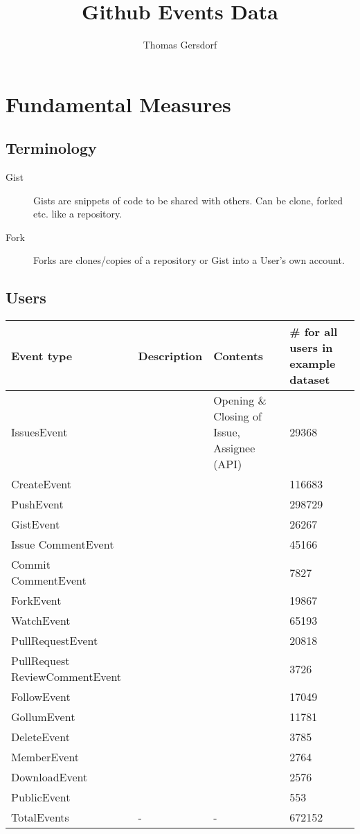 \documentclass[a4paper,10pt]{article}
\title{Github Events Data}
\author{Thomas Gersdorf}
\begin{document}
\maketitle


\section{Fundamental Measures}
\subsection{Terminology}
\begin{description}
 \item[Gist] Gists are snippets of code to be shared with others. Can be clone, forked etc. like a repository.
\item [Fork] Forks are clones/copies of a repository or Gist into a User's own account.
\end{description}

\subsection{Users}

\begin{tabular}{|p{2.5cm}|p{4cm}|p{4cm}|p{2cm}|}\hline
\textbf{Event type} & \textbf{Description}&  \textbf{Contents}& \textbf{\#  for all users in example dataset} \\\hline
 IssuesEvent  &    &  Opening \& Closing of Issue, Assignee (API) &29368\\\hline
CreateEvent    &    & &  116683\\\hline
PushEvent   &    &   &  298729\\\hline
GistEvent   &    &   &  26267\\\hline
Issue
CommentEvent &    &    &   45166\\\hline
Commit
CommentEvent &    &    &  7827\\\hline
ForkEvent   &    &    & 19867\\\hline
WatchEvent  &  &    &   65193\\\hline
PullRequestEvent     &    &  &  20818\\\hline
PullRequest
ReviewCommentEvent  & && 3726\\\hline
FollowEvent   &    &  & 17049\\\hline
GollumEvent  &    &  &  11781\\\hline
DeleteEvent   &    &  &   3785\\\hline
MemberEvent   &    & &    2764\\\hline
DownloadEvent  &    & & 2576\\\hline
PublicEvent &  &    &  553\\\hline
TotalEvents & - & - & 672152 \\\hline

\end{tabular}
\end{document}
